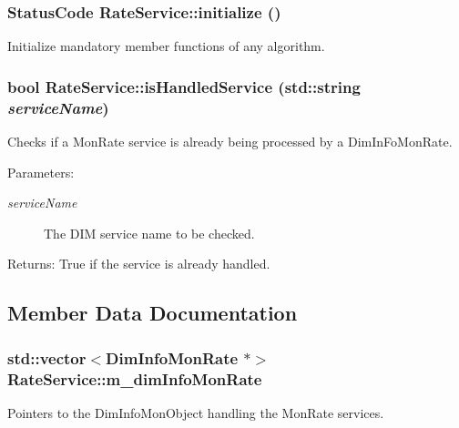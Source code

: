 \subsubsection{\setlength{\rightskip}{0pt plus 5cm}Status\-Code Rate\-Service::initialize ()}\label{classRateService_a1}


Initialize mandatory member functions of any algorithm. 

\subsubsection{\setlength{\rightskip}{0pt plus 5cm}bool Rate\-Service::is\-Handled\-Service (std::string {\em service\-Name})\hspace{0.3cm}{\tt  [private]}}\label{classRateService_d0}


Checks if a Mon\-Rate service is already being processed by a Dim\-In\-Fo\-Mon\-Rate.

\begin{Desc}
\item[Parameters:]
\begin{description}
\item[{\em service\-Name}]The DIM service name to be checked.\end{description}
\end{Desc}
\begin{Desc}
\item[Returns:]True if the service is already handled. \end{Desc}


\subsection{Member Data Documentation}
\subsubsection{\setlength{\rightskip}{0pt plus 5cm}std::vector$<${\bf Dim\-Info\-Mon\-Rate} $\ast$$>$ {\bf Rate\-Service::m\_\-dim\-Info\-Mon\-Rate}\hspace{0.3cm}{\tt  [private]}}\label{classRateService_r4}


Pointers to the Dim\-Info\-Mon\-Object handling the Mon\-Rate services. 
